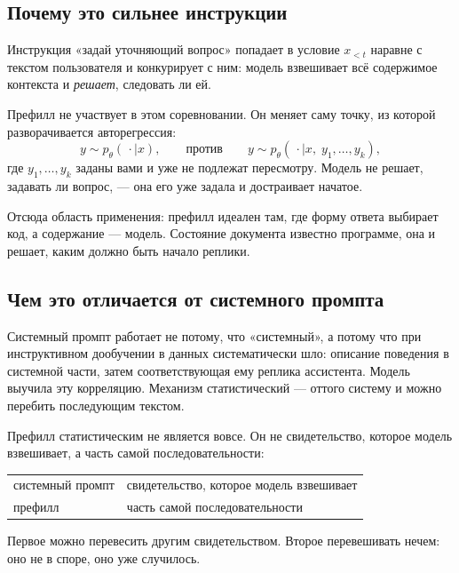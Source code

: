 \documentclass[11pt,a4paper]{article}
\begin{document}
\subsection{Почему это сильнее инструкции}

Инструкция «задай уточняющий вопрос» попадает в условие $x_{<t}$
наравне с текстом пользователя и конкурирует с ним: модель взвешивает
всё содержимое контекста и \emph{решает}, следовать ли ей.

Префилл не участвует в этом соревновании. Он меняет саму точку, из
которой разворачивается авторегрессия:
\[
y \sim p_\theta(\,\cdot \mid x),
\qquad\text{против}\qquad
y \sim p_\theta(\,\cdot \mid x,\; y_1,\dots,y_k),
\]
где $y_1,\dots,y_k$ заданы вами и уже не подлежат пересмотру. Модель
не решает, задавать ли вопрос, — она его уже задала и достраивает
начатое.

\begin{keybox}
Отсюда область применения: префилл идеален там, где форму ответа
выбирает код, а содержание — модель. Состояние документа известно
программе, она и решает, каким должно быть начало реплики.
\end{keybox}

\subsection{Чем это отличается от системного промпта}

Системный промпт работает не потому, что «системный», а потому что при
инструктивном дообучении в данных систематически шло: описание поведения
в системной части, затем соответствующая ему реплика ассистента. Модель
выучила эту корреляцию. Механизм статистический — оттого систему и можно
перебить последующим текстом.

Префилл статистическим не является вовсе. Он не свидетельство, которое
модель взвешивает, а часть самой последовательности:

\begin{center}
\begin{tabular}{@{}ll@{}}
\toprule
системный промпт & свидетельство, которое модель взвешивает \\
префилл & часть самой последовательности \\
\bottomrule
\end{tabular}
\end{center}

Первое можно перевесить другим свидетельством. Второе перевешивать
нечем: оно не в споре, оно уже случилось.
\end{document}

